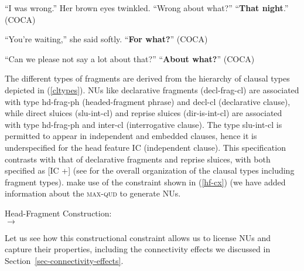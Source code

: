 \documentclass[output=paper
                ,modfonts
                ,nonflat
	        ,collection
	        ,collectionchapter
	        ,collectiontoclongg
 	        ,biblatex
                ,babelshorthands
                ,newtxmath
                ,draftmode
                ,colorlinks, citecolor=brown
]{./langsci/langscibook}
\begin{document}
{\ea ``I was wrong.'' Her brown eyes twinkled. ``Wrong about what?'' ``\textbf{That night}.'' (COCA) \label{34a}\z

\ea ``You're waiting,'' she said softly. ``\textbf{For what?}'' (COCA) \label{35} \z

\ea ``Can we please not say a lot about that?'' ``\textbf{About what?}'' (COCA) \label{36} \z


The different types of fragments are derived from the \citet[333]{Ginzburg:Sag:2000} hierarchy of clausal types depicted in (\ref{cltypes}). NUs like declarative fragments (decl-frag-cl) are associated with type hd-frag-ph (headed-fragment phrase) and decl-cl (declarative clause), while direct sluices (slu-int-cl) and reprise sluices (dir-is-int-cl) are associated with type hd-frag-ph and inter-cl (interrogative clause). The type slu-int-cl is permitted to appear in independent and embedded clauses, hence it is underspecified for the head feature IC (independent clause). This specification contrasts with that of declarative fragments and reprise sluices, with both specified as [IC +] (see \citealt[333]{Ginzburg:Sag:2000} for the overall organization of the clausal types including fragment types).
%
%
%
%
\citet[304]{Ginzburg:Sag:2000} make use of the constraint shown in (\ref{hf-cx}) (we have added information about the \textsc{max-qud} to generate NUs.
%
%

\ea
\label{hf-cx}
Head-Fragment Construction:\\
$\rightarrow$

\z
Let us see how this constructional constraint allows us to
license NUs and capture their properties, including the connectivity effects we discussed in Section~\ref{sec-connectivity-effects}.

}
\end{document}
